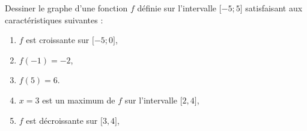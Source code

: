 
\begin{exercice}\label{exosmath-0505}

    Dessiner le graphe d'une fonction \( f\) définie sur l'intervalle \( \mathopen[ -5 ;5 \mathclose]\)  satisfaisant aux caractéristiques suivantes :
    \begin{enumerate}
        \item
            \( f\) est croissante sur \( \mathopen[ -5; 0 \mathclose]\),
        \item
            \( f(-1)=-2\),
        \item
            \( f(5)=6\).
        \item
            \( x=3\) est un maximum de \( f\) sur l'intervalle $\mathopen[ 2 , 4 \mathclose]$,
        \item
            \( f\) est décroissante sur \( \mathopen[ 3 , 4 \mathclose]\),
    \end{enumerate}
    

\end{exercice}
